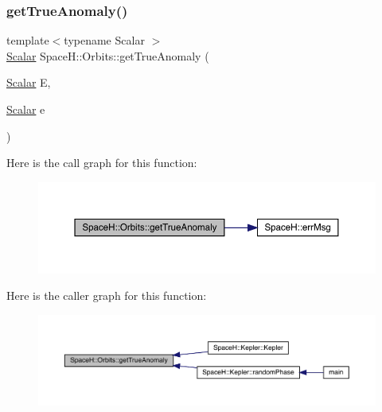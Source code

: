 \subsubsection{\texorpdfstring{get\+True\+Anomaly()}{getTrueAnomaly()}}
{\footnotesize\ttfamily template$<$typename Scalar $>$ \\
\mbox{\hyperlink{create_kepler_8cpp_a8c2981f3f834be9448a6ab06c28748eb}{Scalar}} Space\+H\+::\+Orbits\+::get\+True\+Anomaly (\begin{DoxyParamCaption}\item[{\mbox{\hyperlink{create_kepler_8cpp_a8c2981f3f834be9448a6ab06c28748eb}{Scalar}}}]{E,  }\item[{\mbox{\hyperlink{create_kepler_8cpp_a8c2981f3f834be9448a6ab06c28748eb}{Scalar}}}]{e }\end{DoxyParamCaption})}

Here is the call graph for this function\+:
\nopagebreak
\begin{figure}[H]
\begin{center}
\leavevmode
\includegraphics[width=350pt]{namespace_space_h_1_1_orbits_a43d1a07ed25eaf775f3a83d7000a2596_cgraph}
\end{center}
\end{figure}
Here is the caller graph for this function\+:
\nopagebreak
\begin{figure}[H]
\begin{center}
\leavevmode
\includegraphics[width=350pt]{namespace_space_h_1_1_orbits_a43d1a07ed25eaf775f3a83d7000a2596_icgraph}
\end{center}
\end{figure}
\mbox{\label{namespace_space_h_1_1_orbits_a678a54bbf3a8637d6437b4b8b4a39d97}} 
